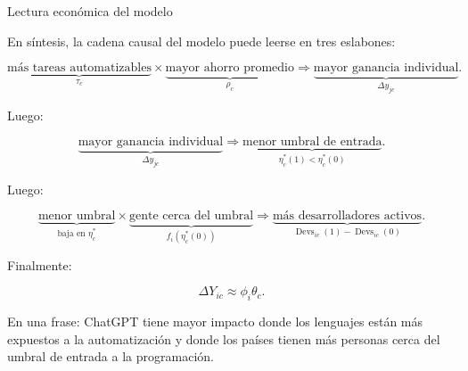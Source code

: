 \documentclass[12pt,a4paper]{article}
\let\textbf\textmd
\newcommand{\Devs}{\operatorname{Devs}}
\begin{document}
\bigskip
\noindent\textbf{Lectura económica del modelo}

\medskip
\noindent En síntesis, la cadena causal del modelo puede leerse en tres eslabones:

\[
\underbrace{\text{más tareas automatizables}}_{\tau_c}
\times
\underbrace{\text{mayor ahorro promedio}}_{\rho_c}
\Longrightarrow
\underbrace{\text{mayor ganancia individual}}_{\Delta y_{jc}}.
\]

Luego:

\[
\underbrace{\text{mayor ganancia individual}}_{\Delta y_{jc}}
\Longrightarrow
\underbrace{\text{menor umbral de entrada}}_{\eta_c^*(1)<\eta_c^*(0)}.
\]

Luego:

\[
\underbrace{\text{menor umbral}}_{\text{baja en }\eta_c^*}
\times
\underbrace{\text{gente cerca del umbral}}_{f_i(\eta_c^*(0))}
\Longrightarrow
\underbrace{\text{más desarrolladores activos}}_{\Devs_{ic}(1)-\Devs_{ic}(0)}.
\]

Finalmente:

\[
\Delta Y_{ic}\approx \phi_i\theta_c.
\]

En una frase: ChatGPT tiene mayor impacto donde los lenguajes están más expuestos a la automatización y donde los países tienen más personas cerca del umbral de entrada a la programación.
\end{document}

